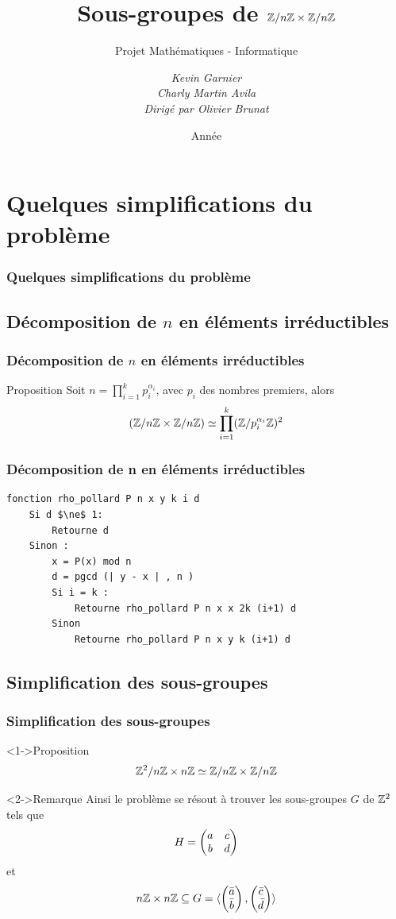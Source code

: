 \documentclass[10pt]{beamer}
\title{Sous-groupes de $\mathbb Z/n\mathbb Z \times \mathbb Z/n\mathbb Z$}
\subtitle{Projet Mathématiques - Informatique}
\author[Kevin Garnier, Charly Martin Avila, Olivier Brunat]{
	\itshape {Kevin Garnier \\
		Charly Martin Avila}\\
		\vspace*{1cm}
	Dirigé par
	Olivier Brunat
}
\date{Année \the\year}
\begin{document}
\begin{frame}
    \titlepage
\end{frame}

\tableofcontents


\section{Quelques simplifications du problème}
\begin{frame}
    \frametitle{Quelques simplifications du problème}
    \tableofcontents[currentsection]
\end{frame}


\subsection{Décomposition de $n$ en éléments irréductibles}
\begin{frame}
    \frametitle{Décomposition de $n$ en éléments irréductibles}
    \begin{block}{Proposition}
        Soit $n = \prod\limits_{i = 1}^k p_i^{\alpha_i}$, avec $p_i$ des nombres premiers, alors
        $$(\mathbb Z/n\mathbb Z \times \mathbb Z/n\mathbb Z) \simeq \prod_{i = 1}^k(\mathbb Z/p_i^{\alpha_i}\mathbb Z)^2$$
    \end{block}
\end{frame}


\begin{frame}[fragile]
    \frametitle{Décomposition de n en éléments irréductibles}
    \begin{lstlisting}
fonction rho_pollard P n x y k i d
    Si d $\ne$ 1:
        Retourne d
    Sinon :
        x = P(x) mod n
        d = pgcd (| y - x | , n )
        Si i = k :
            Retourne rho_pollard P n x x 2k (i+1) d
        Sinon
            Retourne rho_pollard P n x y k (i+1) d
    \end{lstlisting}
\end{frame}

\subsection{Simplification des sous-groupes}
\begin{frame}
    \frametitle{Simplification des sous-groupes}
    \begin{block}<1->{Proposition}
        $$\mathbb Z^2/n\mathbb Z \times n\mathbb Z \simeq \mathbb Z/n\mathbb Z \times \mathbb Z/n\mathbb Z $$\end{block}
    \begin{block}<2->{Remarque}
        Ainsi le problème se résout à trouver les sous-groupes $G$ de $\mathbb Z^2$ tels que
        $$H = \begin{pmatrix} a & c\\ b & d \end{pmatrix}$$
        et
        $$n\mathbb Z \times n\mathbb Z \subseteq G = \langle \begin{pmatrix} \bar a\\ \bar b \end{pmatrix}, \begin{pmatrix} \bar c\\ \bar d \end{pmatrix} \rangle$$

    \end{block}
\end{frame}
\end{document}
